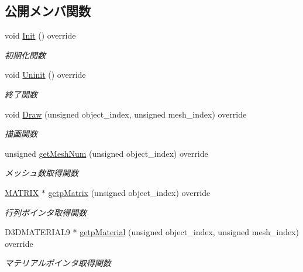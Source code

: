 \subsection*{公開メンバ関数}
\begin{DoxyCompactItemize}
\item 
void \mbox{\hyperlink{class_player_draw_ad79a0fbeb618e0913822b573e5d0be68}{Init}} () override
\begin{DoxyCompactList}\small\item\em 初期化関数 \end{DoxyCompactList}\item 
void \mbox{\hyperlink{class_player_draw_a917b2947914287f23d87ca75cd68f553}{Uninit}} () override
\begin{DoxyCompactList}\small\item\em 終了関数 \end{DoxyCompactList}\item 
void \mbox{\hyperlink{class_player_draw_a8b9e8caa6bea7295f58a0aaddeb9458b}{Draw}} (unsigned object\+\_\+index, unsigned mesh\+\_\+index) override
\begin{DoxyCompactList}\small\item\em 描画関数 \end{DoxyCompactList}\item 
unsigned \mbox{\hyperlink{class_player_draw_ac618153d70492f73299c58a50d565431}{get\+Mesh\+Num}} (unsigned object\+\_\+index) override
\begin{DoxyCompactList}\small\item\em メッシュ数取得関数 \end{DoxyCompactList}\item 
\mbox{\hyperlink{_vector3_d_8h_a032295cd9fb1b711757c90667278e744}{M\+A\+T\+R\+IX}} $\ast$ \mbox{\hyperlink{class_player_draw_a334e94f368f6bd571da866d69333f313}{getp\+Matrix}} (unsigned object\+\_\+index) override
\begin{DoxyCompactList}\small\item\em 行列ポインタ取得関数 \end{DoxyCompactList}\item 
D3\+D\+M\+A\+T\+E\+R\+I\+A\+L9 $\ast$ \mbox{\hyperlink{class_player_draw_acb94ea7611a99698507321e44b7e9acb}{getp\+Material}} (unsigned object\+\_\+index, unsigned mesh\+\_\+index) override
\begin{DoxyCompactList}\small\item\em マテリアルポインタ取得関数 \end{DoxyCompactList}\item 

\end{DoxyCompactItemize}
